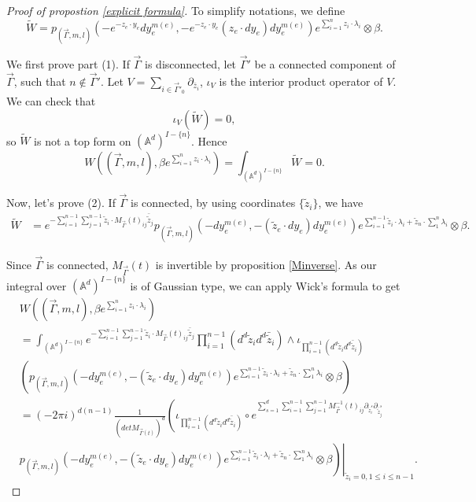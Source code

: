 \documentclass[11pt]{amsart}
\theoremstyle{definition}
\theoremstyle{remark}
\numberwithin{equation}{section}
\begin{document}
    \begin{proof}[Proof of propostion \ref{explicit formula}]
    To simplify notations, we define
    \[
    \tilde{W}=p_{(\vec{\Gamma},m,l)}(-e^{-z_{e}\cdot y_{e}}dy_{e}^{m(e)},-e^{-z_{e}\cdot y_{e}}(z_{e}\cdot dy_{e})dy_{e}^{m(e)})e^{\sum_{i=1}^{n}z_{i}\cdot\lambda_{i}}\otimes \beta.
  \]

    We first prove part (1). If $\vec{\Gamma}$ is disconnected, let $\vec{\Gamma}'$ be a connected component of $\vec{\Gamma}$, such that $n\notin \vec{\Gamma}'$. Let $ V=\sum_{i\in\vec{\Gamma}'_{0}}\partial_{\bar{z}_{i}}$, $\iota_{ V}$ is the interior product operator of $ V$. We can check that
    $$
    \iota_{ V}(\tilde{W})=0,
    $$
    so $\tilde{W}$ is not a top form on $(\mathbb{A}^d)^{ I-\{n\}}$. Hence $$
    W((\vec{\Gamma},m,l),\beta e^{\sum_{i=1}^{n}z_{i}\cdot\lambda_{i}})=\int_{(\mathbb{A}^{d})^{ I-\{n\}}}\tilde{W}=0.
    $$

    Now, let's prove (2). If $\vec{\Gamma}$ is connected, by using coordinates $\{\tilde{z}_{i}\}$, we have
    \begin{align*}
        \tilde{W}&=e^{-\sum_{i=1}^{n-1}\sum_{j=1}^{n-1}\tilde{z}_{i}\cdot M_{\vec{\Gamma}}(t)_{ij}\bar{\tilde{z}}_{j}}p_{(\vec{\Gamma},m,l)}(-dy_{e}^{m(e)},-(\tilde{z}_{e}\cdot dy_{e})dy_{e}^{m(e)})e^{\sum_{i=1}^{n-1}\tilde{z}_{i}\cdot\lambda_{i}+\tilde{z}_{n}\cdot\sum_{1}^{n}\lambda_{i}}\otimes \beta.
    \end{align*}

    Since $\vec{\Gamma}$ is connected, $M_{\vec{\Gamma}}(t)$ is invertible by proposition \ref{Minverse}. 
    As our integral over $(\mathbb{A}^d)^{ I-\{n\}}$ is of Gaussian type, we can apply Wick's formula to get
    \begin{align*}
        &W((\vec{\Gamma},m,l),\beta e^{\sum_{i=1}^{n}z_{i}\cdot\lambda_{i}})\\
        &=\int_{(\mathbb{A}^d)^{ I-\{n\}}}e^{-\sum_{i=1}^{n-1}\sum_{j=1}^{n-1}\tilde{z}_{i}\cdot M_{\vec{\Gamma}}(t)_{ij}\bar{\tilde{z}}_{j}}\prod_{i=1}^{n-1}(d^{d}\tilde{z}_{i}d^{d}\bar{\tilde{z}}_{i})\wedge \iota_{\prod_{i=1}^{n-1}(d^{d}\tilde{z}_{i}d^{d}\bar{\tilde{z}}_{i})}\\
        &\left(p_{(\vec{\Gamma},m,l)}(-dy_{e}^{m(e)},-(\tilde{z}_{e}\cdot dy_{e})dy_{e}^{m(e)})e^{\sum_{i=1}^{n-1}\tilde{z}_{i}\cdot\lambda_{i}+\tilde{z}_{n}\cdot\sum_{1}^{n}\lambda_{i}}\otimes \beta\right)\\
        &=(-2\pi i)^{d(n-1)}\frac{1}{(detM_{\vec{\Gamma}(t)})^{d}}\left(
        \iota_{\prod_{i=1}^{n-1}(d^{d}\tilde{z}_{i}d^{d}\bar{\tilde{z}}_{i})}
        \circ
        e^{\sum_{s=1}^{d}\sum_{i=1}^{n-1}\sum_{j=1}^{n-1} M^{-1}_{\vec{\Gamma}}(t)_{ij}\partial_{\tilde{z}_{i}^{s}}\partial_{\bar{\tilde{z}}_{j}^{s}}}
        \right.\\
        &\left.\left.p_{(\vec{\Gamma},m,l)}(-dy_{e}^{m(e)},-(\tilde{z}_{e}\cdot dy_{e})dy_{e}^{m(e)})e^{\sum_{i=1}^{n-1}\tilde{z}_{i}\cdot\lambda_{i}+\tilde{z}_{n}\cdot\sum_{1}^{n}\lambda_{i}}\otimes \beta\right)\right|_{\tilde{z}_{i}=0,1\leq i\leq n-1}.
    \end{align*}


\end{proof}
\end{document}

